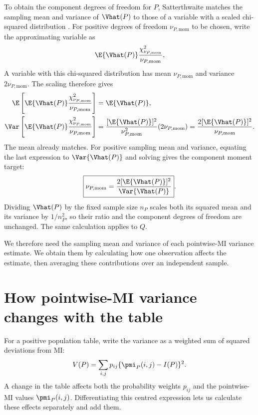 To obtain the component degrees of freedom for \(P\), Satterthwaite
matches the sampling mean and variance of \(\Vhat(P)\) to those of a
variable with a scaled chi-squared distribution
\citep{satterthwaite1946}. For positive degrees of freedom
\(\nu_{P,\mathrm{mom}}\) to be chosen, write the approximating variable as
\begin{equation}
  \E\{\Vhat(P)\}
  \frac{\chi^2_{\nu_{P,\mathrm{mom}}}}{\nu_{P,\mathrm{mom}}},
  \label{eq:scaled-chi-working}
\end{equation}
A variable with this chi-squared distribution has mean
\(\nu_{P,\mathrm{mom}}\) and variance
\(2\nu_{P,\mathrm{mom}}\). The scaling therefore gives
\begin{align*}
  \E\left[
    \E\{\Vhat(P)\}
    \frac{\chi^2_{\nu_{P,\mathrm{mom}}}}{\nu_{P,\mathrm{mom}}}
  \right]
  &=\E\{\Vhat(P)\},\\
  \Var\left[
    \E\{\Vhat(P)\}
    \frac{\chi^2_{\nu_{P,\mathrm{mom}}}}{\nu_{P,\mathrm{mom}}}
  \right]
  &=\frac{[\E\{\Vhat(P)\}]^2}{\nu_{P,\mathrm{mom}}^2}
    (2\nu_{P,\mathrm{mom}})
   =\frac{2[\E\{\Vhat(P)\}]^2}{\nu_{P,\mathrm{mom}}}.
\end{align*}
The mean already matches. For positive sampling mean and variance,
equating the last expression to \(\Var\{\Vhat(P)\}\) and solving
gives the component moment target:
\begin{equation}
  \boxed{
  \nu_{P,\mathrm{mom}}
  =\frac{2[\E\{\Vhat(P)\}]^2}
         {\Var\{\Vhat(P)\}}
  }.
  \label{eq:component-df-moments}
\end{equation}
Dividing \(\Vhat(P)\) by the fixed sample size \(n_P\) scales both
its squared mean and its variance by \(1/n_P^2\), so their ratio and
the component degrees of freedom are unchanged. The same calculation
applies to \(Q\).

We therefore need the sampling mean and variance of each pointwise-MI
variance estimate. We obtain them by calculating how one observation
affects the estimate, then averaging these contributions over an
independent sample.

\section{How pointwise-MI variance changes with the table}
\label{sec:variance-sensitivity}

For a positive population table, write the variance as a weighted sum of
squared deviations from MI:
\begin{equation}
  V(P)=\sum_{i,j}p_{ij}\{\pmi_P(i,j)-I(P)\}^2.
  \label{eq:v-centred-form}
\end{equation}
A change in the table affects both the probability weights \(p_{ij}\)
and the pointwise-MI values \(\pmi_P(i,j)\). Differentiating this
centred expression lets us calculate these effects separately and add them.

